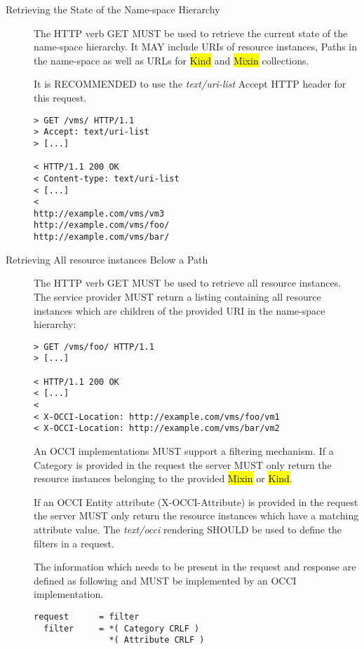 \documentclass[10pt,a4paper]{article}
\begin{document}
\begin{description}

   \item[Retrieving the State of the Name-space Hierarchy] The HTTP
     verb GET MUST be used to retrieve the current state of the
     name-space hierarchy. It MAY include URIs of resource instances,
     Paths in the name-space as well as URLs for \hl{Kind} and
     \hl{Mixin} collections.

   It is RECOMMENDED to use the \emph{text/uri-list} Accept HTTP
   header for this request.

\begin{verbatim}
> GET /vms/ HTTP/1.1
> Accept: text/uri-list
> [...]

< HTTP/1.1 200 OK
< Content-type: text/uri-list
< [...]
<
http://example.com/vms/vm3
http://example.com/vms/foo/
http://example.com/vms/bar/
\end{verbatim}

  \item[Retrieving All resource instances Below a Path] The HTTP verb
    GET MUST be used to retrieve all resource instances. The service
    provider MUST return a listing containing all resource instances
    which are children of the provided URI in the name-space
    hierarchy:

\begin{verbatim}
> GET /vms/foo/ HTTP/1.1
> [...]
 
< HTTP/1.1 200 OK
< [...]
< 
< X-OCCI-Location: http://example.com/vms/foo/vm1
< X-OCCI-Location: http://example.com/vms/bar/vm2
\end{verbatim}

    An OCCI implementations MUST support a filtering mechanism. If a
    Category is provided in the request the server MUST only return
    the resource instances belonging to the provided \hl{Mixin} or
    \hl{Kind}.

    If an OCCI Entity attribute (X-OCCI-Attribute) is provided in the
    request the server MUST only return the resource instances which
    have a matching attribute value. The \emph{text/occi} rendering
    SHOULD be used to define the filters in a request.

    The information which needs to be present in the request and
    response are defined as following and MUST be implemented by an
    OCCI implementation.

\begin{verbatim}
request      = filter
  filter     = *( Category CRLF )
               *( Attribute CRLF )


\end{verbatim}
\end{description}
\end{document}
